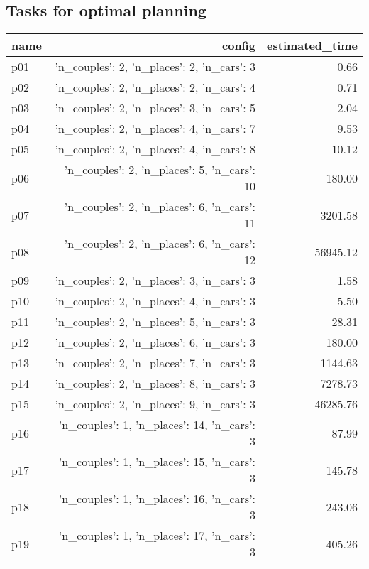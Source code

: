 \documentclass{article}
\begin{document}
                                \subsection*{Tasks for optimal planning}
                                
                            \begin{center}
                            \scriptsize
                            \begin{tabular}{@{}l|r|r@{}}
                            name & config & estimated\_time\\\midrule
                              p01&{'n\_couples': 2, 'n\_places': 2, 'n\_cars': 3}&0.66\\
  p02&{'n\_couples': 2, 'n\_places': 2, 'n\_cars': 4}&0.71\\
  p03&{'n\_couples': 2, 'n\_places': 3, 'n\_cars': 5}&2.04\\
  p04&{'n\_couples': 2, 'n\_places': 4, 'n\_cars': 7}&9.53\\
  p05&{'n\_couples': 2, 'n\_places': 4, 'n\_cars': 8}&10.12\\
  p06&{'n\_couples': 2, 'n\_places': 5, 'n\_cars': 10}&180.00\\
  p07&{'n\_couples': 2, 'n\_places': 6, 'n\_cars': 11}&3201.58\\
  p08&{'n\_couples': 2, 'n\_places': 6, 'n\_cars': 12}&56945.12\\
  p09&{'n\_couples': 2, 'n\_places': 3, 'n\_cars': 3}&1.58\\
  p10&{'n\_couples': 2, 'n\_places': 4, 'n\_cars': 3}&5.50\\
  p11&{'n\_couples': 2, 'n\_places': 5, 'n\_cars': 3}&28.31\\
  p12&{'n\_couples': 2, 'n\_places': 6, 'n\_cars': 3}&180.00\\
  p13&{'n\_couples': 2, 'n\_places': 7, 'n\_cars': 3}&1144.63\\
  p14&{'n\_couples': 2, 'n\_places': 8, 'n\_cars': 3}&7278.73\\
  p15&{'n\_couples': 2, 'n\_places': 9, 'n\_cars': 3}&46285.76\\
  p16&{'n\_couples': 1, 'n\_places': 14, 'n\_cars': 3}&87.99\\
  p17&{'n\_couples': 1, 'n\_places': 15, 'n\_cars': 3}&145.78\\
  p18&{'n\_couples': 1, 'n\_places': 16, 'n\_cars': 3}&243.06\\
  p19&{'n\_couples': 1, 'n\_places': 17, 'n\_cars': 3}&405.26\\

\end{tabular}
\end{center}
\end{document}
